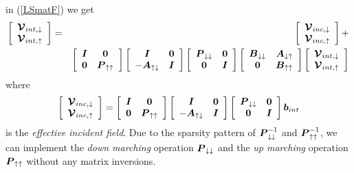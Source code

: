 in (\ref{LSmatF}) we get
\begin{eqnarray} \label{fLSeqn}
\left[{\begin{array}{c}{\CB V}_{int, \downarrow }\\ {\CB V}_{int, \uparrow 
}\end{array}}\right]&=&\left[{\begin{array}{c}{\CB V}_{inc, \downarrow }\\ 
{\CB V}_{inc, \uparrow 
}\end{array}}\right]+\nonumber\\
&&
\left[{\begin{array}{cc}{\bmi I}&{\bf 0}\\
{\bf 0}&{\bmi P}_{ \uparrow \uparrow }\end{array}}\right]
\left[{\begin{array}{cc}{\bmi I}&{\bf 0}\\
-{\bmi A}_{ \uparrow \downarrow }&{\bmi I}\end{array}}\right]
\left[{\begin{array}{cc}{\bmi P}_{ \downarrow \downarrow }&{\bf 0}\\{\bf 
0}&{\bmi I}\end{array}}\right]
\left[{\begin{array}{cc}{\bmi B}_{ \downarrow 
\downarrow }&{\bmi A}_{ \downarrow \uparrow }\\ {\bf 0}&{\bmi B}_{ \uparrow \uparrow 
}\end{array}}\right]\left[{\begin{array}{c}{\CB V}_{int, \downarrow }\\ 
{\CB V}_{int, \uparrow }\end{array}}\right]
\end{eqnarray} 
where
\[
\left[{\begin{array}{c}{\CB V}_{inc, \downarrow }\\ 
{\CB V}_{inc,\uparrow}\end{array}}\right]=
\left[{\begin{array}{cc}{\bmi I}&{\bf 0}\\
{\bf 0}&{\bmi P}_{ \uparrow \uparrow }\end{array}}\right]
\left[{\begin{array}{cc}{\bmi I}&{\bf 0}\\
-{\bmi A}_{ \uparrow \downarrow }&{\bmi I}\end{array}}\right]
\left[{\begin{array}{cc}{\bmi P}_{ \downarrow \downarrow }&{\bf 0}\\{\bf 
0}&{\bmi I}\end{array}}\right]
{\bmi b}_{int}
\] 
is the {\em effective incident field\/}. Due to the sparsity 
pattern of ${\bmi P}_{ \downarrow \downarrow }^{-1}$ and ${\bmi P}_{ 
\uparrow \uparrow }^{-1}$, we can implement the {\em down marching\/} 
operation ${\bmi P}_{ \downarrow \downarrow }$ and the {\em up marching\/} 
operation ${\bmi P}_{ \uparrow \uparrow }$ without any matrix inversions.


